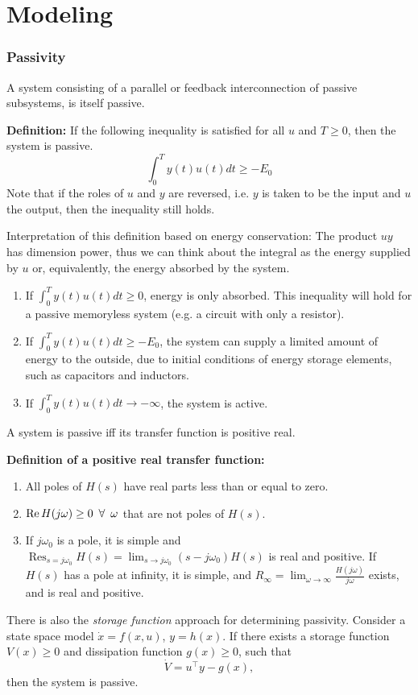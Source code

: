 \part{Modeling}
\section{Passivity}
A system consisting of a parallel or feedback interconnection of passive subsystems, is itself passive.

\textbf{Definition:} If the following inequality is satisfied for all $u$ and $T \geq 0$, then the system is passive.
\begin{equation}
    \int_0^T y(t)u(t)dt \geq -E_0
\end{equation}
Note that if the roles of $u$ and $y$ are reversed, i.e. $y$ is taken to be the input and $u$ the output, then the inequality still holds.

Interpretation of this definition based on energy conservation: The product $uy$ has dimension power, thus we can think about the integral as the energy supplied by $u$ or, equivalently, the energy absorbed by the system.
\begin{enumerate}
    \item If $\int_0^T y(t)u(t)dt \geq 0$, energy is only absorbed. This inequality will hold for a passive memoryless system (e.g. a circuit with only a resistor).
    \item If $\int_0^T y(t)u(t)dt \geq -E_0$, the system can supply a limited amount of energy to the outside, due to initial conditions of energy storage elements, such as capacitors and inductors.
    \item If $\int_0^T y(t)u(t)dt \to -\infty$, the system is active.
\end{enumerate}
A system is passive iff its transfer function is positive real.

\textbf{Definition of a positive real transfer function:}
\begin{enumerate}
    \item All poles of $H(s)$ have real parts less than or equal to zero.
    \item $\operatorname{Re} H(j\omega) \geq 0 \enskip \forall \enskip \omega$ that are not poles of $H(s)$.
    \item If $j\omega_0$ is a pole, it is simple and $\operatorname{Res}_{s=j\omega_0} H(s) = \lim_{s \to j\omega_0} (s-j\omega_0)H(s)$ is real and positive. If $H(s)$ has a pole at infinity, it is simple, and $R_\infty = \lim_{\omega \to \infty} \frac{H(j\omega)}{j\omega}$ exists, and is real and positive.
\end{enumerate}
There is also the \textit{storage function} approach for determining passivity. Consider a state space model $\dot{x} = f(x,u)$, $y=h(x)$. If there exists a storage function $V(x) \geq 0$ and dissipation function $g(x) \geq 0$, such that
\begin{equation}
    \dot{V} = u^\top y - g(x),
\end{equation}
then the system is passive.